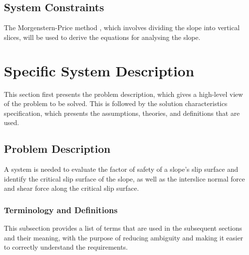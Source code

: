 \documentclass[12pt]{article}
\begin{document}
\subsection{System Constraints}
\label{Sec:SysConstraints}
The Morgenstern-Price method \cite{morgenstern1965}, which involves dividing the slope into vertical slices, will be used to derive the equations for analysing the slope.

\section{Specific System Description}
\label{Sec:SpecSystDesc}
This section first presents the problem description, which gives a high-level view of the problem to be solved. This is followed by the solution characteristics specification, which presents the assumptions, theories, and definitions that are used.

\subsection{Problem Description}
\label{Sec:ProbDesc}
A system is needed to evaluate the factor of safety of a slope's slip surface and identify the critical slip surface of the slope, as well as the interslice normal force and shear force along the critical slip surface.

\subsubsection{Terminology and Definitions}
\label{Sec:TermDefs}
This subsection provides a list of terms that are used in the subsequent sections and their meaning, with the purpose of reducing ambiguity and making it easier to correctly understand the requirements.
\end{document}
